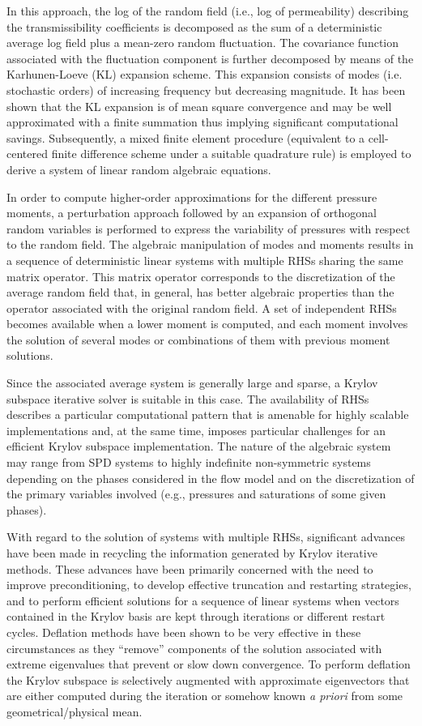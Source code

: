 \documentclass{report}
\begin{document}
In this approach, the log of the random field (i.e., log of
permeability) describing the transmissibility coefficients is
decomposed as the sum of a deterministic average log field plus a
mean-zero random fluctuation. The covariance function associated
with the fluctuation component is further decomposed by means of the
Karhunen-Loeve (KL) expansion scheme. This expansion consists of
modes (i.e. stochastic orders) of increasing frequency but
decreasing magnitude. It has been shown that the KL expansion is of
mean square convergence and may be well approximated with a finite
summation thus implying significant computational savings.
Subsequently, a mixed finite element procedure (equivalent to a
cell-centered finite difference scheme under a suitable quadrature
rule) is employed to derive a system of linear random algebraic
equations.

In order to compute higher-order approximations for the different
pressure moments, a perturbation approach followed by an expansion
of orthogonal random variables is performed to express the
variability of pressures with respect to the random field. The
algebraic manipulation of modes and moments results in a sequence of
deterministic linear systems with multiple RHSs sharing the same
matrix operator. This matrix operator corresponds to the
discretization of the average random field that, in general, has
better algebraic properties than the operator associated with the
original random field. A set of independent RHSs becomes available
when a lower moment is computed, and each moment involves the
solution of several modes or combinations of them with previous
moment solutions.

Since the associated average system is generally large and sparse, a
Krylov subspace iterative solver is suitable in this case. The
availability of RHSs describes a particular computational pattern
that is amenable for highly scalable implementations and, at the
same time, imposes particular challenges for an efficient Krylov
subspace implementation. The nature of the algebraic system may
range from SPD systems to highly indefinite non-symmetric systems
depending on the phases considered in the flow model and on the
discretization of the primary variables involved (e.g., pressures
and saturations of some given phases).

With regard to the solution of systems with multiple RHSs,
significant advances have been made in recycling the information
generated by Krylov iterative methods. These advances have been
primarily concerned with the need to improve preconditioning, to
develop effective truncation and restarting strategies, and to
perform efficient solutions for a sequence of linear systems when
vectors contained in the Krylov basis are kept through iterations or
different restart cycles. Deflation methods have been shown to be
very effective in these circumstances as they ``remove'' components
of the solution associated with extreme eigenvalues that prevent or
slow down convergence. To perform deflation the Krylov subspace is
selectively augmented with approximate eigenvectors that are either
computed during the iteration or somehow known \emph{a priori} from
some geometrical/physical mean.
\end{document}
